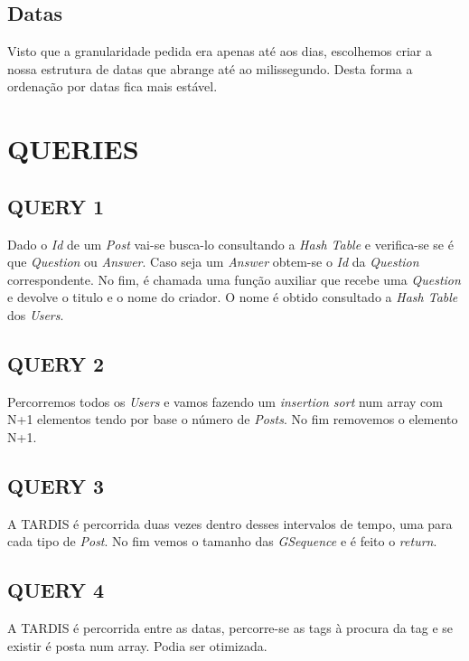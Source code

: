 \documentclass[letterpaper, 10 pt, conference]{IEEEtran}  %
\begin{document}
\subsection{Datas}

Visto que a granularidade pedida era apenas até aos dias, escolhemos criar a nossa estrutura de datas que abrange até ao milissegundo. Desta forma a ordenação por datas fica mais estável.

\section{QUERIES}

\subsection{QUERY 1}

Dado o \textit{Id} de um \textit{Post} vai-se busca-lo consultando a \textit{Hash Table} e verifica-se se é que \textit{Question} ou \textit{Answer}. Caso seja um \textit{Answer} obtem-se o \textit{Id} da \textit{Question} correspondente. No fim, é chamada uma função auxiliar que recebe uma \textit{Question} e devolve o titulo e o nome do criador. O nome é obtido consultado a \textit{Hash Table} dos \textit{Users}.

\subsection{QUERY 2}

Percorremos todos os \textit{Users} e vamos fazendo um \textit{insertion sort} num array com N+1 elementos tendo por base o número de \textit{Posts}. No fim removemos o elemento N+1.

\subsection{QUERY 3}

A TARDIS é percorrida duas vezes dentro desses intervalos de tempo, uma para cada tipo de \textit{Post}. No fim vemos o tamanho das \textit{GSequence} e é feito o \textit{return}.

\subsection{QUERY 4}

A TARDIS é percorrida entre as datas, percorre-se as tags à procura da tag e se existir é posta num array. Podia ser otimizada.
\end{document}
